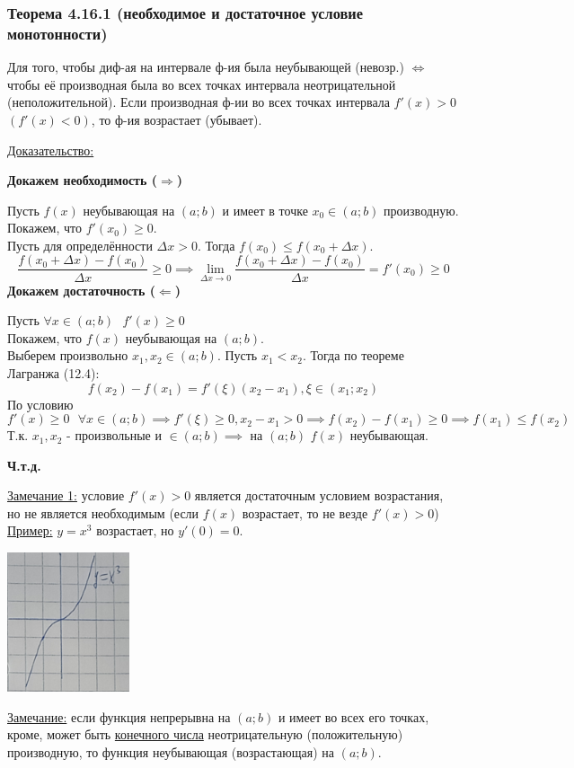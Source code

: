 \documentclass[12pt]{article}
\begin{document}
    \subsubsection*{Теорема 4.16.1 (необходимое и достаточное условие монотонности)}\label{th:4.16.1}
    Для того, чтобы диф-ая на интервале ф-ия была неубывающей (невозр.) $\Leftrightarrow$ чтобы её производная была во всех точках интервала неотрицательной (неположительной).
    Если производная ф-ии во всех точках интервала $f'(x) > 0$ $(f'(x) < 0)$, то ф-ия возрастает (убывает).\par\noindent
    \underline{Доказательство:}
    \begin{adjustwidth}{1.5em}{1.5em}
        \textbf{Докажем необходимость ($\Rightarrow$)}\par\noindent
        Пусть $f(x)$ неубывающая на $(a; b)$ и имеет в точке $x_0 \in (a; b)$ производную.\\
        Покажем, что $f'(x_0) \ge 0$.\\
        Пусть для определённости $\Delta x > 0$. Тогда $f(x_0) \le f(x_0 + \Delta x)$.
        \[ \frac{f(x_0 + \Delta x) - f(x_0)}{\Delta x} \ge 0 \implies \lim_{\Delta x \to 0} \frac{f(x_0 + \Delta x) - f(x_0)}{\Delta x} = f'(x_0) \ge 0 \]
        \textbf{Докажем достаточность ($\Leftarrow$)}\par\noindent
        Пусть $\forall x \in (a; b) \text{ } f'(x) \ge 0$\\
        Покажем, что $f(x)$ неубывающая на $(a;b)$.\\
        Выберем произвольно $x_1, x_2 \in (a; b)$. Пусть $x_1 < x_2$. Тогда по теореме Лагранжа (12.4):
        \[ f(x_2) - f(x_1) = f'(\xi)(x_2-x_1), \xi \in (x_1; x_2) \]
        По условию \[f'(x) \ge 0 \text{ } \forall x \in (a; b) \implies f'(\xi) \ge 0, x_2 - x_1 > 0 \implies f(x_2) - f(x_1) \ge 0 \implies f(x_1) \le f(x_2)\]
        Т.к. $x_1, x_2$ - произвольные и $\in (a; b) \implies$ на $(a;b)$ $f(x)$ неубывающая.
        \begin{center}
            \textbf{Ч.т.д.}
        \end{center}
    \end{adjustwidth}
    \underline{Замечание 1:} условие $f'(x) > 0$ является достаточным условием возрастания, но не является необходимым (если $f(x)$ возрастает, то не везде $f'(x) > 0$)\\
    \underline{Пример:} $y = x^3$ возрастает, но $y'(0) = 0$.
    \begin{center}
        \includegraphics{4.16.1}
    \end{center}
    \underline{Замечание:} если функция непрерывна на $(a;b)$ и имеет во всех его точках, кроме, может быть \underline{конечного числа} неотрицательную (положительную) производную, то функция неубывающая (возрастающая) на $(a;b)$.
\end{document}
